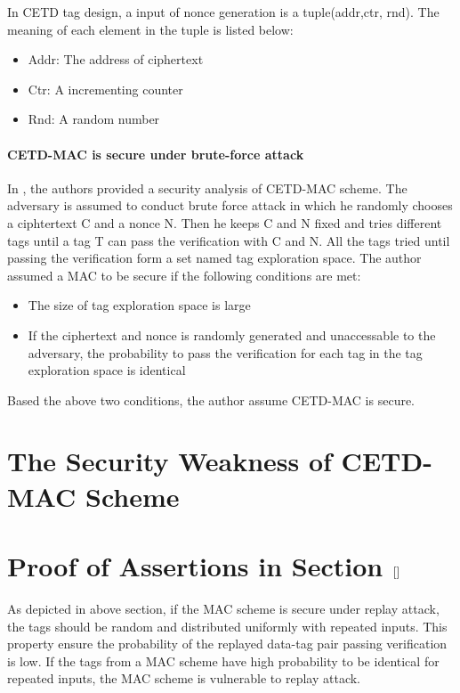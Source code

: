 \documentclass{article}
\begin{document}
In CETD tag design, a input of nonce generation is a tuple(addr,ctr, rnd). The meaning of each element in the tuple is listed below: 
\begin{itemize}
	\item Addr: The address of ciphertext
	\item Ctr: A incrementing counter 
	\item Rnd: A random number
\end{itemize}
\paragraph{CETD-MAC is secure under brute-force attack}
In \cite{}, the authors provided a security analysis of CETD-MAC scheme. The adversary is assumed to conduct brute force attack in which he randomly chooses a ciphtertext C and a nonce N. Then he keeps C and N fixed and tries different tags until a tag T can pass the verification with C and N. All the tags tried until passing the verification form a set named tag exploration space. The author assumed a MAC to be secure if the following conditions are met:
\begin{itemize}
	\item The size of tag exploration space is large
	\item If the ciphertext and nonce is randomly generated and unaccessable to the adversary, the probability to pass the verification for each tag in the tag exploration space is identical
\end{itemize}
Based the above two conditions, the author assume CETD-MAC is secure.



\appendix
\section{The Security Weakness of CETD-MAC Scheme}
\section{Proof of Assertions in Section $\ref{}$}
As depicted in above section, if the MAC scheme is secure under replay attack,
the tags should be random and distributed uniformly with repeated inputs. This
property ensure the probability of the replayed data-tag pair passing verification
is low. If the tags from a MAC scheme have high probability to be identical for
repeated inputs, the MAC scheme is vulnerable to replay attack.
\end{document}
